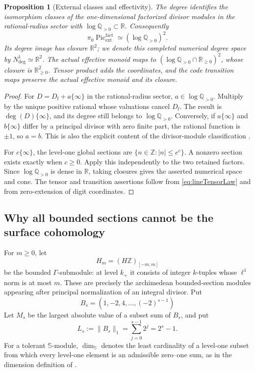 \documentclass[11pt]{amsart}
\newtheorem{proposition}[theorem]{Proposition}
\theoremstyle{definition}
\theoremstyle{remark}
\newcommand{\R}{\mathbb R}
\newcommand{\Z}{\mathbb Z}
\newcommand{\Q}{\mathbb Q}
\newcommand{\Pic}{\operatorname{Pic}}
\begin{document}
\begin{proposition}[External classes and effectivity]
\label{prop:externaleffectivity}
The degree identifies the isomorphism classes of the one-dimensional
factorized divisor modules in the rational-radius sector with
$\log\Q_{>0}\subset\R$.  Consequently
\begin{equation}\label{eq:rationalPicardClasses}
 \pi_0\Pic_{\mathrm{ext}}^{\mathrm{fact}}
 \simeq(\log\Q_{>0})^2.
\end{equation}
Its degree image has closure $\R^2$; we denote this completed numerical
degree space by $N^1_{\deg}\simeq\R^2$.  The actual effective monoid maps to
$(\log\Q_{>0}\cap\R_{\geq0})^2$, whose closure is
$\R_{\geq0}^2$.  Tensor product adds the coordinates, and the code
transition maps preserve the actual effective monoid and its closure.
\end{proposition}

\begin{proof}
For $D=D_{\mathrm f}+a\{\infty\}$ in the rational-radius sector,
$a\in\log\Q_{>0}$.  Multiply by the unique positive rational
whose valuations cancel $D_{\mathrm f}$.  The result is
$\deg(D)\{\infty\}$, and its degree still belongs to
$\log\Q_{>0}$.  Conversely, if $a\{\infty\}$ and
$b\{\infty\}$ differ by a principal divisor with zero finite part, the
rational function is $\pm1$, so $a=b$.  This is also the explicit content of
the divisor-module classification
\cite[Proposition~6.4(ii)]{CC-AbsoluteAlgebra}.

For $c\{\infty\}$, the level-one global sections are
$\{n\in\Z:|n|\leq e^c\}$.  A nonzero section exists exactly when $c\geq0$.
Apply this independently to the two retained factors.  Since
$\log\Q_{>0}$ is dense in $\R$, taking closures gives the asserted numerical
space and cone.  The tensor and transition assertions follow from
\eqref{eq:lineTensorLaw} and from zero-extension of digit coordinates.
\end{proof}

\subsection{Why all bounded sections cannot be the surface cohomology}

For $m\geq0$, let
\[
 H_m=(H\Z)_{[-m,m]}
\]
be the bounded $\Gamma$-submodule: at level $k_+$ it consists of integer
$k$-tuples whose $\ell^1$ norm is at most $m$.  These are precisely the
archimedean bounded-section modules appearing after principal normalization
of an integral divisor.  Put
\[
 B_s=(1,-2,4,\ldots,(-2)^{s-1})
\]
Let $M_s$ be the largest absolute value of a subset sum of $B_s$, and put
\begin{equation}\label{eq:digitL1radius}
 L_s:=\|B_s\|_1=\sum_{j=0}^{s-1}2^j=2^s-1.
\end{equation}
For a tolerant $\mathbb S$-module, $\dim_{\mathbb S}$ denotes the least
cardinality of a level-one subset from which every level-one element is an
admissible zero--one sum, as in the dimension definition of
\cite[Appendix~A]{CC-RRSpecZ}.
\end{document}
